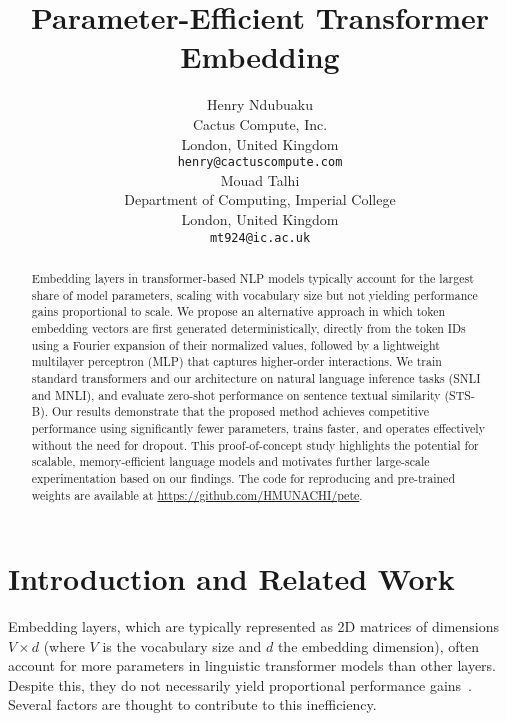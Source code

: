 \documentclass{article}
\begin{document}
\begin{center}
\title{Parameter-Efficient Transformer Embedding}
\end{center}
\author{Henry Ndubuaku \\ 
Cactus Compute, Inc. \\
London, United Kingdom \\
\texttt{henry@cactuscompute.com} \\
\And
Mouad Talhi \\
Department of Computing, Imperial College \\
London, United Kingdom \\
\texttt{mt924@ic.ac.uk} \\
}
\maketitle
\begin{abstract}
Embedding layers in transformer-based NLP models typically account for the largest share of model parameters, scaling with vocabulary size but not yielding performance gains proportional to scale. We propose an alternative approach in which token embedding vectors are first generated deterministically, directly from the token IDs using a Fourier expansion of their normalized values, followed by a lightweight multilayer perceptron (MLP) that captures higher-order interactions. We train standard transformers and our architecture on natural language inference tasks (SNLI and MNLI), and evaluate zero-shot performance on sentence textual similarity (STS-B). Our results demonstrate that the proposed method achieves competitive performance using significantly fewer parameters, trains faster, and operates effectively without the need for dropout. This proof-of-concept study highlights the potential for scalable, memory-efficient language models and motivates further large-scale experimentation based on our findings. The code for reproducing and pre-trained weights are available at \url{https://github.com/HMUNACHI/pete}.
\end{abstract}
\section{Introduction and Related Work}
Embedding layers, which are typically represented as 2D matrices of dimensions \(V \times d\) (where \(V\) is the vocabulary size and \(d\) the embedding dimension), often account for more parameters in linguistic transformer models than other layers. Despite this, they do not necessarily yield proportional performance gains~\cite{lan2019albert, rajbhandari2020zero, shen2020qbert}. Several factors are thought to contribute to this inefficiency. 
\end{document}
